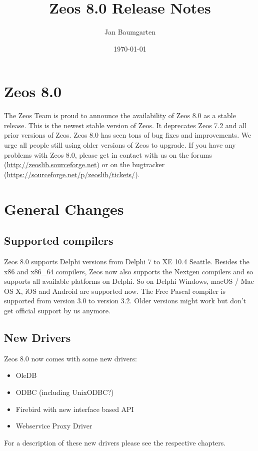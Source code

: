 \documentclass[a4paper,12pt,oneside]{article}
\title{Zeos 8.0 Release Notes}
\author{Jan Baumgarten}
\date{\today}
\begin{document}
\maketitle

\section{Zeos 8.0}
The Zeos Team is proud to announce the availability of Zeos 8.0 as a stable release.
This is the newest stable version of Zeos.
It deprecates Zeos 7.2 and all prior versions of Zeos.
Zeos 8.0 has seen tons of bug fixes and improvements.
We urge all people still using older versions of Zeos to upgrade.
If you have any problems with Zeos 8.0, please get in contact with us on the forums (\url{http://zeoslib.sourceforge.net}) or on the bugtracker (\url{https://sourceforge.net/p/zeoslib/tickets/}).

\section{General Changes}
\label{sec:GeneralChanges}
\subsection{Supported compilers}
\label{sec:GeneralChanges_SupportedCompilers}
Zeos 8.0 supports Delphi versions from Delphi 7 to XE 10.4 Seattle.
Besides the x86 and x86\_64 compilers, Zeos now also supports the Nextgen compilers and so supports all available platforms on Delphi.
So on Delphi Windows, macOS / Mac OS X, iOS and Android are supported now.
The Free Pascal compiler is supported from version 3.0 to version 3.2.
Older versions might work but don't get official support by us anymore.

\subsection{New Drivers}
\label{sec:GeneralChanges_NewDrivers}
Zeos 8.0 now comes with some new drivers:
\begin{itemize}
  \item OleDB
	\item ODBC (including UnixODBC?)
	\item Firebird with new interface based API
	\item Webservice Proxy Driver
\end{itemize}
For a description of these new drivers please see the respective chapters.
\end{document}
